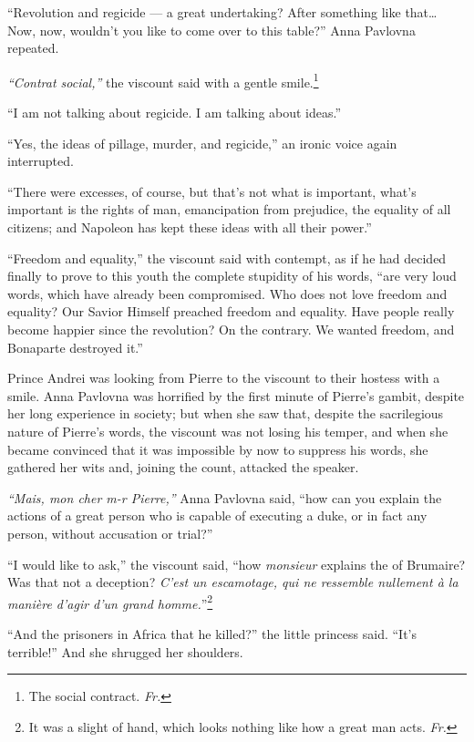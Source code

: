 ``Revolution and regicide --- a great undertaking? After something like that\ldots{} Now, now, wouldn't you like to come over to this table?'' Anna Pavlovna repeated. %

\textit{``Contrat social,''} the viscount said with a gentle smile.\footnote{The social contract. \textit{Fr.}} %

``I am not talking about regicide. I am talking about ideas.'' %

``Yes, the ideas of pillage, murder, and regicide,'' an ironic voice again interrupted. %

``There were excesses, of course, but that's not what is important, what's important is the rights of man, emancipation from prejudice, the equality of all citizens; and Napoleon has kept these ideas with all their power.'' %

``Freedom and equality,'' the viscount said with contempt, as if he had decided finally to prove to this youth the complete stupidity of his words, ``are very loud words, which have already been compromised. Who does not love freedom and equality? Our Savior Himself preached freedom and equality. Have people really become happier since the revolution? On the contrary. We wanted freedom, and Bonaparte destroyed it.'' %

Prince Andrei was looking from Pierre to the viscount to their hostess with a smile. Anna Pavlovna was horrified by the first minute of Pierre's gambit, despite her long experience in society; but when she saw that, despite the sacrilegious nature of Pierre's words, the viscount was not losing his temper, and when she became convinced that it was impossible by now to suppress his words, she gathered her wits and, joining the count, attacked the speaker.

\textit{``Mais, mon cher m-r Pierre,''} Anna Pavlovna said, ``how can you explain the actions of a great person who is capable of executing a duke, or in fact any person, without accusation or trial?'' %

``I would like to ask,'' the viscount said, ``how \textit{monsieur} explains the  of Brumaire? Was that not a deception? \textit{C'est un escamotage, qui ne ressemble nullement \`a la mani\`ere d'agir d'un grand homme.}''\footnote{It was a slight of hand, which looks nothing like how a great man acts. \textit{Fr.}} %

``And the prisoners in Africa that he killed?'' the little princess said. ``It's terrible!'' And she shrugged her shoulders. %

